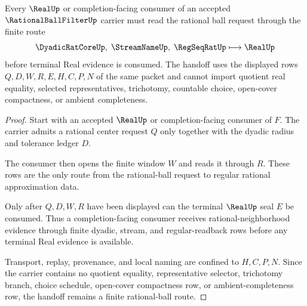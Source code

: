 \begin{theorem}
\label{thm:rational-ball-filter-finite-window-handoff}
Every $\RealUp$ or completion-facing consumer of an accepted $\RationalBallFilterUp$ carrier must read the rational ball request through the finite route
$$
\DyadicRatCoreUp,\;\StreamNameUp,\;\RegSeqRatUp
\longmapsto
\RealUp
$$
before terminal Real evidence is consumed. The handoff uses the displayed rows $Q,D,W,R,E,H,C,P,N$ of the same packet and cannot import quotient real equality, selected representatives, trichotomy, countable choice, open-cover compactness, or ambient completeness.
\end{theorem}
\begin{proof}
Start with an accepted $\RealUp$ or completion-facing consumer of $F$. The carrier admits a rational center request $Q$ only together with the dyadic radius and tolerance ledger $D$.

The consumer then opens the finite window $W$ and reads it through $R$. These rows are the only route from the rational-ball request to regular rational approximation data.

Only after $Q,D,W,R$ have been displayed can the terminal $\RealUp$ seal $E$ be consumed. Thus a completion-facing consumer receives rational-neighborhood evidence through finite dyadic, stream, and regular-readback rows before any terminal Real evidence is available.

Transport, replay, provenance, and local naming are confined to $H,C,P,N$. Since the carrier contains no quotient equality, representative selector, trichotomy branch, choice schedule, open-cover compactness row, or ambient-completeness row, the handoff remains a finite rational-ball route.
\end{proof}



